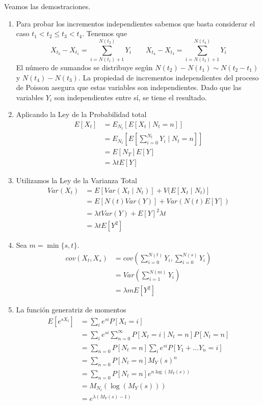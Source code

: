 \documentclass[twoside]{article}
\begin{document}
\begin{solucion}
Veamos las demostraciones.
\begin{enumerate}
\item Para probar los incrementos independientes sabemos que basta considerar el caso $t_1<t_2\leq t_3 <t_4$. Tenemos que
$$
X_{t_2}-X_{t_1} = \sum_{i=N(t_1)+1}^{N(t_2)} Y_i \qquad X_{t_4}-X_{t_3} = \sum_{i=N(t_3)+1}^{N(t_4)} Y_i
$$
El número de sumandos se distribuye según $N(t_2)-N(t_1) \sim N(t_2-t_1)$ y $N(t_4)-N(t_3)$. La propiedad de incrementos independientes del proceso de Poisson asegura que estas variables son independientes. Dado que las variables $Y_i$ son independientes entre sí, se tiene el resultado.
\item Aplicando la Ley de la Probabilidad total
\begin{align*}
E[X_t] &= E_{N_t}\left[E\left[ X_t \mid N_t = n\right]\right] \\
&=E_{N_t}\left[E\left[\sum_{i=0}^{N_t} Y_i \mid N_t = n\right]\right]\\
&=E[N_T]E[Y]\\
&=\lambda tE[Y]
\end{align*}		
\item Utilizamos la Ley de la Varianza Total
\begin{align*}
Var(X_t) &= E[Var(X_t\mid N_t)]+V(E[X_t\mid N_t)]\\
&=E[N(t)Var(Y)]+Var(N(t)E[Y])\\
&=\lambda t Var(Y)+ E[Y]^2 \lambda t\\
&=\lambda t E[Y^2]
\end{align*}
\item Sea $m=\min\{s,t\}$.
\begin{align*}
cov(X_t,X_s)&=cov\left(\sum_{i=0}^{N(t)} Y_i,\sum_{i=0}^{N(s)} Y_i\right)\\
&= Var\left(\sum_{i=1}^{N(m)} Y_i\right)\\
&=\lambda m E[Y^2] 
\end{align*}
\item La función generatriz de momentos
\begin{align*}
E[e^{sX_t}] &=\sum_i e^{si}P[X_t = i]\\
&=\sum_i e^{si}\sum_{n=0}^\infty P[X_t = i\mid N_t =n ] P[N_t = n]\\
&=\sum_{n=0} P[N_t=n]\sum_i  e^{si} P[Y_1+ \dotsc Y_n = i ]\\
&=\sum_{n=0} P[N_t=n] M_Y(s)^n\\
&= \sum_{n=0} P[N_t=n]e^{n\log(M_Y(s))} \\
&= M_{N_t}(\log(M_Y(s)))\\
&=e^{\lambda(M_Y(s)-1)}
\end{align*}

\end{enumerate}
\end{solucion}
\end{document}
